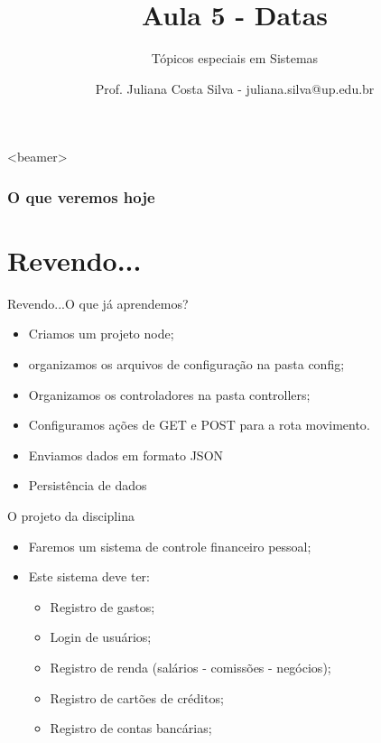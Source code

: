 \documentclass{beamer}
\title{Aula 5  - Datas}
\subtitle{Tópicos especiais em Sistemas}
\author{Prof. Juliana Costa Silva - juliana.silva@up.edu.br}
\begin{document}
  \frame[c]{\maketitle}
      \begin{frame}<beamer>
      \frametitle{O que veremos hoje}
      \tableofcontents
    \end{frame}
    \section{Revendo...}
    \begin{frame}{Revendo...}{O que já aprendemos?}
      
      \begin{itemize}
            \item Criamos um projeto node;
            \item organizamos os arquivos de configuração na pasta config;
            \item Organizamos os controladores na pasta controllers;
            \item Configuramos ações de GET e POST para a rota \alert{movimento}.
            \item Enviamos dados em formato JSON
             \item Persistência de dados
       \end{itemize}
     \end{frame}
\begin{frame}[label=proof]{O projeto da disciplina}
	\begin{itemize}
	\item Faremos um sistema de controle financeiro pessoal;
	\item Este sistema deve ter:
	\begin{itemize}
	\item Registro de gastos;
	\item Login de usuários;
	\item Registro de renda (salários - comissões - negócios);
	\item Registro de cartões de créditos;
	\item Registro de contas bancárias;
	\end{itemize}
	\end{itemize}
    \end{frame}
\end{document}
